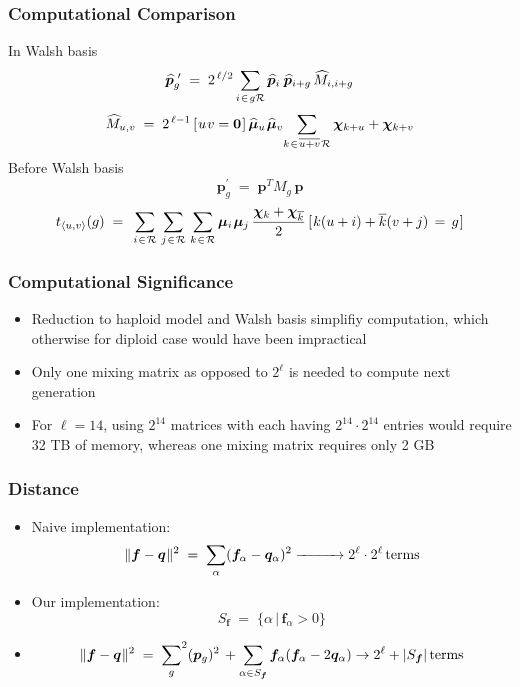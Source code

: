 \documentclass[aspectratio=169]{beamer}
\newcommand{\nudge}{\hspace{0.01in}}
\begin{document}
  \begin{frame}
    \frametitle{Computational Comparison}
	  In Walsh basis 
	    \[
	  \widehat{\bm{p}}_g^{\,\,\prime} \; = \; 2^{\,\ell/2} \sum_{i \nudge \in \nudge g \mathcal{R}}
	  \widehat{\bm{p}}_i \, \nudge \widehat{\bm{p}}_{i+g} \,\widehat{M}_{i,i+g} 	  
	 \]
	 \[
	  \widehat{M}_{u,v} \; = \; 2^{\,\ell-1} \,[\nudge u \nudge v = {\bf
	  0}\nudge]\, \widehat{\bm{\mu}}_u \nudge \widehat{\bm{\mu}}_v \!  \sum_{k
	\nudge \in \nudge \overline{u+v} \nudge \mathcal{R}} \bm{\chi}_{k + u} +
	\bm{\chi}_{k + v}
	\]	
	 Before Walsh basis
	    \[ \bm{p}_g^\prime \; = \; \bm{p}^T M_g \, \bm{p} \]
	    \[ t_{\langle u,v \rangle}(g) \; = \;\,
      \sum_{i \nudge \in \nudge \mathcal{R}} \, \sum_{j \nudge \in \nudge \mathcal{R}} \,
      \sum_{k \nudge \in \nudge \mathcal{R}}
      \bm{\mu}_i \nudge \bm{\mu}_j \, \frac{\bm{\chi}_k + \bm{\chi}_{\overline{k}}}{2} \,
      [\nudge k (u + i) + \overline{k}(v + j) \, = \, g\nudge]  \]
  \end{frame}
  
  \begin{frame}
    \frametitle{ Computational Significance}
    \begin{itemize}
      \item{\vspace{-0.5in}
      Reduction to haploid model and Walsh basis simplifiy computation, which otherwise for diploid case would have been impractical} 
      \vspace{0.1in}
      \item{Only one mixing matrix as opposed to $2^\ell$ is needed to compute next generation}
      \vspace{0.1in}
      \item{For $\ell = 14$, using $2^{14}$ matrices with each having $2^{14} \cdot 2^{14}$ 
      entries would require 32 TB of memory, whereas one mixing matrix requires only 2 GB}
    \end{itemize}
  \end{frame}
  
  \begin{frame}
    \frametitle{Distance}
    \begin{itemize}      
      \item{Naive implementation: 
      \[
	\|{\bm f} - {\bm q} \hspace{0.005in} \|^2 \; = \;
	  {\sum_{\alpha}} ({\bm f}_\alpha-{\bm q}_\alpha)^2 
	   \xrightarrow{\hspace*{1cm}} 2^\ell \cdot 2^\ell \, \text{terms} 
	\]
      }      
      \item{Our implementation:
      \[
	      S_{\bm f} \; = \; \{ \alpha \, | \, {\bm f}_\alpha > 0 \}
	      \]
      }
      \item{
	\begin{equation*}
	  \|{\bm f} - {\bm q} \hspace{0.005in} \|^2 \; = \; {\sum_{g}}^2 ({\bm p}_{g})^2 \, +
	  \sum_{\alpha \in {S_{\bm f}}} {\bm f}_\alpha ({\bm f}_\alpha- 2 {\bm q}_\alpha) \to 2^\ell + |S_{\bm f}| \, \text{terms} 
	\end{equation*}
      }      
    \end{itemize}
  \end{frame}
  
\end{document}
